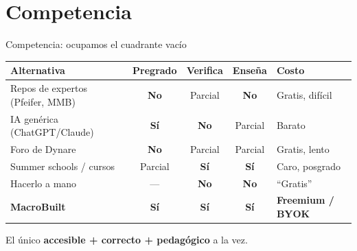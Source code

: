 \section{Competencia}

\begin{frame}{Competencia: ocupamos el cuadrante vacío}
  \begin{center}\scriptsize
  \renewcommand{\arraystretch}{1.3}
  \newcommand{\si}{\textcolor{mbGreen}{\textbf{Sí}}}
  \newcommand{\nott}{\textcolor{spicy}{\textbf{No}}}
  \newcommand{\mq}{\textcolor{carrot}{Parcial}}
  \begin{tabular}{@{}>{\raggedright\arraybackslash}p{} c c c >{\raggedright\arraybackslash}p{}@{}}
    \toprule
    \textbf{Alternativa} & \textbf{Pregrado} & \textbf{Verifica} & \textbf{Enseña} & \textbf{Costo} \\
    \midrule
    Repos de expertos (Pfeifer, MMB) & \nott & \mq & \nott & Gratis, difícil \\
    IA genérica (ChatGPT/Claude) & \si & \nott & \mq & Barato \\
    Foro de Dynare & \nott & \mq & \mq & Gratis, lento \\
    Summer schools / cursos & \mq & \si & \si & Caro, posgrado \\
    Hacerlo a mano & --- & \nott & \nott & \enquote{Gratis} \\
    \midrule
    \textcolor{mbPurple}{\textbf{MacroBuilt}} & \si & \si & \si & \textbf{Freemium / BYOK} \\
    \bottomrule
  \end{tabular}
  \end{center}
  \vspace{4pt}
  \begin{center}\small
  El único \textbf{accesible + correcto + pedagógico} a la vez.
  \end{center}
\end{frame}

